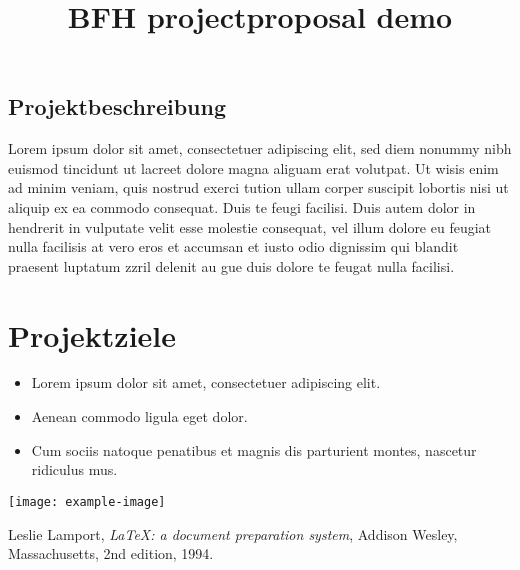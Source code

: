 \documentclass[
	trilingual,
	type=projectproposal,
	twocolumn
]{bfhpub}
\begin{document}
\title{BFH projectproposal demo}
\subject{Das ist ein Teaser auf dem Titelblatt. Inveniat odis vid quist eos ut
	odicidi psandaest, omnis ex et re laborep eribusamet es ulluptaquia
	suntur se nihic in eum dero eossit, nihil imaximi llatus repta.}



%


\begin{ProjectDescription}
  \section{Projektbeschreibung}
  Lorem ipsum dolor sit amet, consectetuer adipiscing elit, sed diem nonummy nibh euismod tincidunt ut lacreet dolore magna aliguam erat volutpat. Ut wisis enim ad minim veniam, quis nostrud exerci tution ullam corper suscipit lobortis nisi ut aliquip ex ea commodo consequat. Duis te feugi facilisi. Duis autem dolor in hendrerit in vulputate velit esse molestie consequat, vel illum dolore eu feugiat nulla facilisis at vero eros et accumsan et iusto odio dignissim qui blandit praesent luptatum zzril delenit au gue duis dolore te feugat nulla facilisi.
\end{ProjectDescription}

\maketitle

\section{Projektziele}
\begin{itemize}
  \item Lorem ipsum dolor sit amet, consectetuer adipiscing elit.
  \item Aenean commodo ligula eget dolor. \cite{lamport94}
  \item Cum sociis natoque penatibus et magnis dis parturient montes, nascetur ridiculus mus.
\end{itemize}

\vfill
\texttt{[image: example-image]}
\par\nointerlineskip\bfhRule

\newpage
\begin{thebibliography}{9}
	
	Leslie Lamport,
	\textit{\LaTeX: a document preparation system},
	Addison Wesley, Massachusetts,
	2nd edition,
	1994.
	
\end{thebibliography}

\vfill
{}
\end{document}
